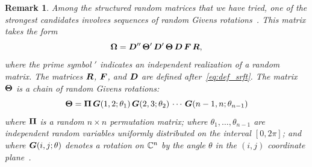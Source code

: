 \documentclass{article}
\newtheorem{remark}{Remark}
\begin{document}
\lsp

\begin{remark}
\label{remark:random_givens}\rm
Among the structured random matrices that
we have tried, one of the strongest candidates involves sequences
of random Givens rotations~\cite{2008_rokhlin_leastsquares}.
This matrix takes the form
\begin{equation}
\label{eq:random_Givens}
\bm{\Omega} = \bm{D}''\,\bm{\Theta}'\,\bm{D}'\,\bm{\Theta}\,\bm{D}\,\bm{F}\,\bm{R},
\end{equation}
where the prime symbol $'$ indicates an independent realization
of a random matrix.
The matrices $\bm{R}$, $\bm{F}$, and $\bm{D}$ are defined after~\eqref{eq:def_srft}.
The matrix $\bm{\Theta}$ is a chain of random Givens rotations:
$$
\bm{\Theta} = \bm{\Pi} \,\bm{G}(1, 2; \theta_1) \,\bm{G}(2, 3; \theta_2) \, \cdots \,
\bm{G}(n-1, n; \theta_{n-1})
$$
where $\bm{\Pi}$ is a random $n \times n$ permutation matrix;
where $\theta_1, \dots, \theta_{n-1}$ are independent random
variables uniformly distributed on the interval $[0, 2\pi]$;
and where $\bm{G}(i, j; \theta)$ denotes a rotation on $\mathbb{C}^{n}$ by the angle $\theta$
in the $(i, j)$ coordinate plane~\cite[\S5.1.8]{golub}.
\end{remark}
\end{document}
